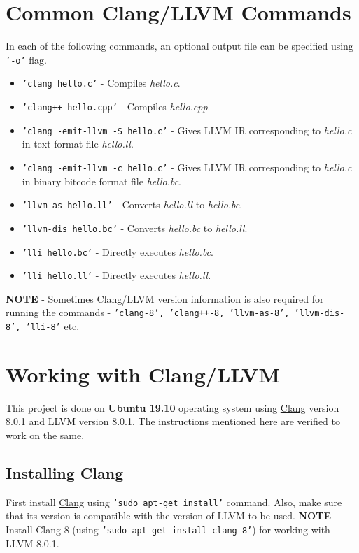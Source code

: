 \section{Common Clang/LLVM Commands}
\label{sec:CommonClangLlvmCommands}

In each of the following commands, an optional output file can be specified using 
\texttt{'-o'} flag.
\begin{itemize} \tightlist
  \item \texttt{'clang hello.c'} - Compiles \textit{hello.c}.
  \item \texttt{'clang++ hello.cpp'} - Compiles \textit{hello.cpp}.
  \item \texttt{'clang -emit-llvm -S hello.c'} - Gives LLVM IR corresponding to \textit{hello.c} in text format file \textit{hello.ll}.
  \item \texttt{'clang -emit-llvm -c hello.c'} - Gives LLVM IR corresponding to \textit{hello.c} in binary bitcode format file \textit{hello.bc}.
  \item \texttt{'llvm-as hello.ll'} - Converts \textit{hello.ll} to \textit{hello.bc}.
  \item \texttt{'llvm-dis hello.bc'} - Converts \textit{hello.bc} to \textit{hello.ll}.
  \item \texttt{'lli hello.bc'} - Directly executes \textit{hello.bc}.
  \item \texttt{'lli hello.ll'} - Directly executes \textit{hello.ll}.
\end{itemize}

\noindent \textbf{NOTE} - Sometimes Clang/LLVM version information is also 
required for running the commands - \texttt{'clang-8', 'clang++-8, 'llvm-as-8', 'llvm-dis-8', 'lli-8'} etc.

\section{Working with Clang/LLVM}
\label{sec:WorkingWithClangLlvm}

This project is done on \textbf{Ubuntu 19.10} operating system using 
\href{https://clang.llvm.org/}{Clang} version 8.0.1 and 
\href{https://llvm.org/}{LLVM} version 8.0.1. The instructions 
mentioned here are verified to work on the same.

\subsection{Installing Clang}
\label{subsec:InstallClang}
First install \href{https://clang.llvm.org/}{Clang} using 
\texttt{'sudo apt-get install'} command. Also, make sure that its 
version is compatible with the version of LLVM to be used.
\smallbreak \noindent \textbf{NOTE} - Install Clang-8 (using 
\texttt{'sudo apt-get install clang-8'}) for working with LLVM-8.0.1.

